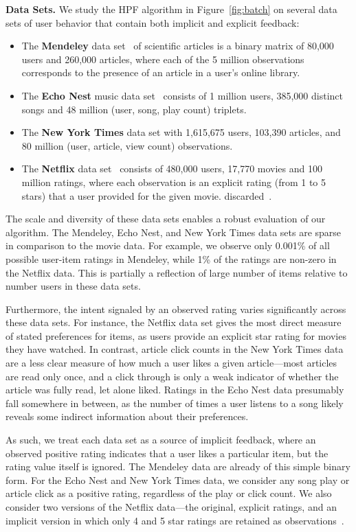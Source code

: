 {\bf Data Sets.} We study the HPF algorithm in Figure~\ref{fig:batch}
on several data sets of user behavior that contain both implicit
and explicit feedback:
\begin{itemize}
\item The {\bf Mendeley} data set~\cite{Jack:2010} of scientific
  articles is a binary matrix of 80,000 users and 260,000 articles,
  where each of the 5 million observations corresponds to the presence
  of an article in a user's online library.
\item The {\bf Echo Nest} music data set~\cite{Bertin-Mahieux:2011}
  consists of 1 million users, 385,000 distinct songs and 48 million
  (user, song, play count) triplets.
\item The {\bf New York Times} data set with 1,615,675 users, 103,390
  articles, and 80 million (user, article, view count)
  observations.
\item The {\bf Netflix} data set~\cite{Koren:2009} consists of 480,000
  users, 17,770 movies and 100 million ratings, where each observation
  is an explicit rating (from 1 to 5 stars) that a user provided for
  the given movie.
  discarded~\cite{Paquet:2013p9197}.
\end{itemize}

The scale and diversity of these data sets enables a robust evaluation
of our algorithm. The Mendeley, Echo Nest, and New York Times data
sets are sparse in comparison to the movie data. For example, we
observe only 0.001\% of all possible user-item ratings in Mendeley,
while 1\% of the ratings are non-zero in the Netflix data. This is
partially a reflection of large number of items relative to number
users in these data sets.

Furthermore, the intent signaled by an observed rating varies
significantly across these data sets. For instance, the Netflix data
set gives the most direct measure of stated preferences for items, as
users provide an explicit star rating for movies they have watched. In
contrast, article click counts in the New York Times data are a less
clear measure of how much a user likes a given article---most articles
are read only once, and a click through is only a weak indicator of
whether the article was fully read, let alone liked. Ratings in the
Echo Nest data presumably fall somewhere in between, as the number of
times a user listens to a song likely reveals some indirect
information about their preferences.

As such, we treat each data set as a source of implicit feedback,
where an observed positive rating indicates that a user likes a
particular item, but the rating value itself is ignored. The Mendeley
data are already of this simple binary form. For the Echo Nest and New
York Times data, we consider any song play or article click as a
positive rating, regardless of the play or click count. We also
consider two versions of the Netflix data---the original, explicit
ratings, and an implicit version in which only 4 and 5 star ratings
are retained as observations~\cite{Paquet:2013p9197}.


